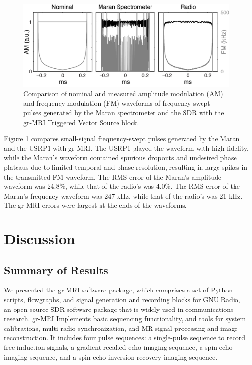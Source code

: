 \documentclass[review]{elsarticle}
\begin{document}
\begin{figure}[!ht]
\begin{center}
\includegraphics[width = 1\textwidth,trim=0 0 0 0,clip=false]{frequency_sweep.png}
\caption{Comparison of nominal and measured amplitude modulation (AM) and frequency modulation (FM) waveforms of frequency-swept pulses generated by the Maran spectrometer and the SDR
with the gr-MRI Triggered Vector Source block.}
\label{fig:f_sweep}
\end{center}
\end{figure}

Figure \ref{fig:f_sweep} compares small-signal frequency-swept pulses generated by the Maran and the USRP1 with gr-MRI. 
The USRP1 played the waveform with high fidelity, 
while the Maran's waveform contained spurious dropouts and undesired phase plateaus due to limited temporal and phase resolution, 
resulting in large spikes in the transmitted FM waveform.
The RMS error of the Maran's amplitude waveform was 24.8\%, 
while that of the radio's was 4.0\%. 
The RMS error of the Maran's frequency waveform was 247 kHz, while that of the radio's was 21 kHz.
The gr-MRI errors were largest at the ends of the waveforms.


\section{Discussion}
\subsection{Summary of Results}
We presented the gr-MRI software package, which comprises a set of Python scripts, flowgraphs, and 
signal generation and recording blocks for GNU Radio, 
an open-source SDR software package that is widely used in communications research. 
gr-MRI Implements basic sequencing functionality, 
and tools for system calibrations, multi-radio synchronization, and 
MR signal processing and image reconstruction. 
It includes four pulse sequences: 
a single-pulse sequence to record free induction signals, 
a gradient-recalled echo imaging sequence, a spin echo imaging sequence,
and a spin echo inversion recovery imaging sequence.
\end{document}
